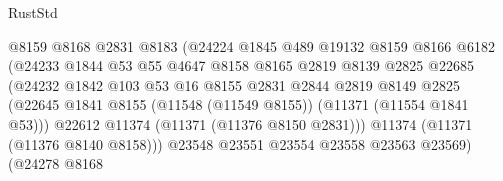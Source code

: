 \begin{lexlean}{RustStd}
\begin{coremodule}
                                        @8159
                                        @8168
                                        @2831
                                        @8183
                                        (@24224
                                          @1845
                                          @489
                                          @19132
                                          @8159
                                          @8166
                                          @6182
                                          (@24233
                                            @1844
                                            @53
                                            @55
                                            @4647
                                            @8158
                                            @8165
                                            @2819
                                            @8139
                                            @2825
                                            @22685
                                            (@24232
                                              @1842
                                              @103
                                              @53
                                              @16
                                              @8155
                                              @2831
                                              @2844
                                              @2819
                                              @8149
                                              @2825
                                              (@22645
                                                @1841
                                                @8155
                                                (@11548 (@11549 @8155))
                                                (@11371 (@11554 @1841 @53)))
                                              @22612
                                              @11374
                                              (@11371 (@11376 @8150 @2831)))
                                            @11374
                                            (@11371 (@11376 @8140 @8158)))
                                          @23548
                                          @23551
                                          @23554
                                          @23558
                                          @23563
                                          @23569)
                                        (@24278
                                          @8168

\end{coremodule}
\end{lexlean}
